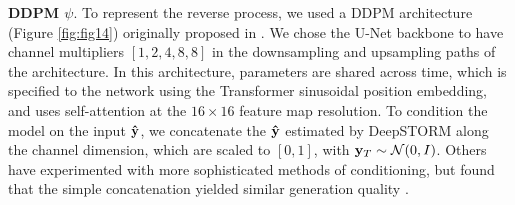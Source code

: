 \textbf{DDPM $\psi$}. To represent the reverse process, we used a DDPM architecture (Figure \ref{fig:fig14}) originally proposed in \parencite{Saharia2021}. We chose the U-Net backbone to have channel multipliers $[1,2,4,8,8]$ in the downsampling and upsampling paths of the architecture. In this architecture, parameters are shared across time, which is specified to the network using the Transformer sinusoidal position embedding, and uses self-attention at the $16 \times 16$ feature map resolution. To condition the model on the input $\bold{\hat{y}}$, we concatenate the $\bold{\hat{y}}$ estimated by DeepSTORM along the channel dimension, which are scaled to $[0,1]$, with $\bold{y}_T\sim \mathcal{N}(0, I)$. Others have experimented with more sophisticated methods of conditioning, but found that the simple concatenation yielded similar generation quality \parencite{Saharia2021}. 


